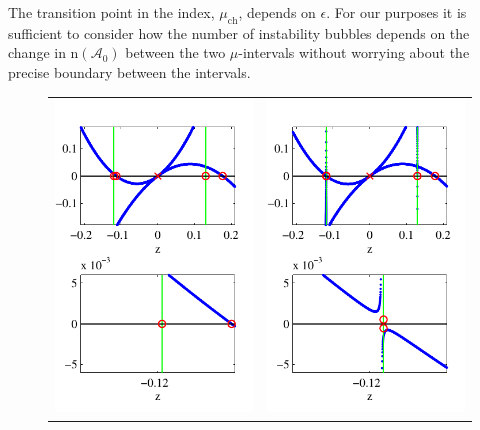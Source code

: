 \documentclass[review,onefignum,onetabnum]{siamart171218}
\newcommand{\rmn}{\mathrm{n}}
\newcommand{\calA}{\mathcal{A}}
\begin{document}
\begin{remark}
The transition point in the index, $\mu_{\mathrm{ch}}$, depends on $\epsilon$. For our purposes it is sufficient to consider how the number of instability bubbles depends on the change in $\rmn(\calA_0)$ between the two $\mu$-intervals without worrying about the precise boundary between the intervals.
\end{remark}

\begin{figure}[ht]%
\begin{center}
\begin{tabular}{cc}
\includegraphics{KreinEvalK000Mu36} &
\includegraphics{KreinEvalK005Mu36}

\end{tabular}
\end{center}
\end{figure}
\end{document}
